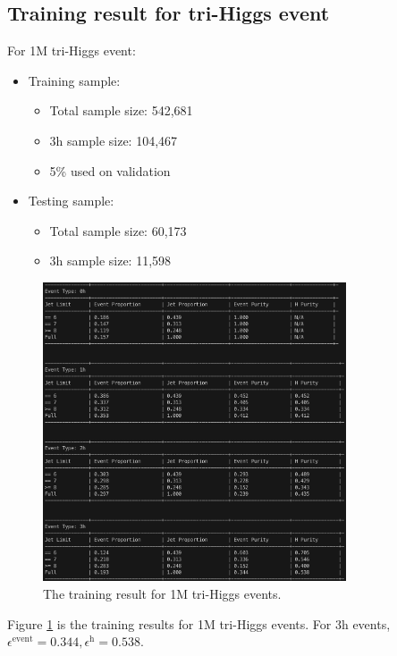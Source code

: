 \documentclass[12pt]{article}
\begin{document}
	\subsection{Training result for tri-Higgs event}%
	\label{sub:training_result_for_trihiggs_event}
		For 1M tri-Higgs event:
		\begin{itemize}
			\item Training sample:
			\begin{itemize}
				\item Total sample size: 542,681
				\item 3h sample size: 104,467
				\item 5\% used on validation
			\end{itemize}
			\item Testing sample: 
				\begin{itemize}
					\item Total sample size: 60,173
					\item 3h sample size: 11,598
				\end{itemize}
		\end{itemize}
		\begin{figure}[htpb]
			\centering
			\includegraphics[width=0.8\textwidth]{1M_triHiggs.png}
			\caption{The training result for 1M tri-Higgs events.}
			\label{fig:1M_triHiggs_result}
		\end{figure}

		Figure \ref{fig:1M_triHiggs_result} is the training results for 1M tri-Higgs events. For 3h events, $\epsilon^{\text{event}} = 0.344, \epsilon^{\text{h}} = 0.538$.
\end{document}
